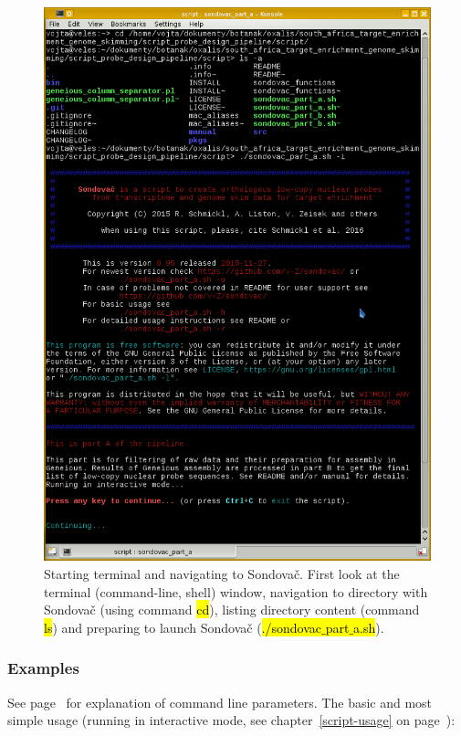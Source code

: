 \documentclass[a4paper, 11pt, twoside]{article}
\renewcommand{\texttt}[1]{\hl{\ttfamily #1}}
\begin{document}
\begin{figure}[htbp]
  \includegraphics[width=\textwidth]{terminal.png}
  \caption[Starting terminal and navigating to Sondovač]{Starting terminal and navigating to Sondovač. First look at the terminal (command-line, shell) window, navigation to directory with Sondovač (using command \texttt{cd}), listing directory content (command \texttt{ls}) and preparing to launch Sondovač (\texttt{./sondovac$\_$part$\_$a.sh}).}
  \label{terminal}
\end{figure}

\subsubsection{Examples}

See page~\pageref{script-usage} for explanation of command line parameters. The basic and most simple usage (running in interactive mode, see chapter~\ref{script-usage} on page~\pageref{script-usage}):
\end{document}
